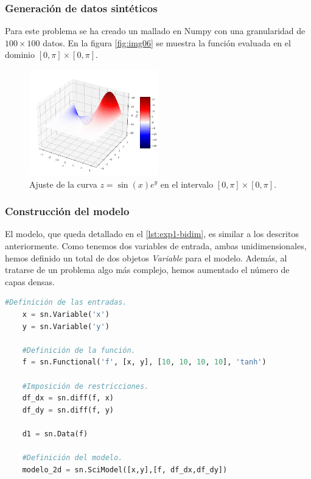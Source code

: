 \subsubsection{Generación de datos sintéticos}
Para este problema se ha creado un mallado en Numpy con una granularidad de $100\times 100$ datos. En la figura \autoref{fig:img06} se muestra la función evaluada en el dominio $[0,\pi]\times [0,\pi]$.
 \begin{figure}[htbp]
    \centering
    \includegraphics[width=0.5\textwidth]{img/img06.png}
    \caption{Ajuste de la curva $z=\sin(x)e^{y}$ en el intervalo $[0,\pi]\times [0,\pi]$.}
    \label{fig:img06}
\end{figure}

\subsubsection{Construcción del modelo}

El modelo, que queda detallado en el \autoref{lst:exp1-bidim}, es similar a los descritos anteriormente. Como tenemos dos variables de entrada, ambas unidimensionales, hemos definido un total de dos objetos \textit{Variable} para el modelo. Además, al tratarse de un problema algo más complejo, hemos aumentado el número de capas densas. 

\begin{lstlisting}[language=Python,caption={Modelo en \textit{SciANN} para ajuste bidimensional.},label={lst:exp1-bidim}]
    #Definición de las entradas.
    x = sn.Variable('x')
    y = sn.Variable('y')
    
    #Definición de la función.
    f = sn.Functional('f', [x, y], [10, 10, 10, 10], 'tanh')
    
    #Imposición de restricciones.
    df_dx = sn.diff(f, x)
    df_dy = sn.diff(f, y)
    
    d1 = sn.Data(f)

    #Definición del modelo.
    modelo_2d = sn.SciModel([x,y],[f, df_dx,df_dy])
\end{lstlisting}

